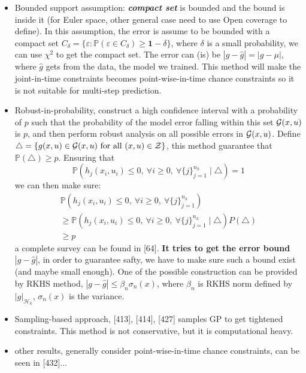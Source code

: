 \documentclass[10pt]{elegantbook}
\newcommand{\mydefination}[1]{\textbf{\textit{\textcolor{structurecolor}{#1}}}}
\begin{document}
\begin{itemize}
    \item Bounded support assumption: \mydefination{compact set} is bounded and the bound is inside it (for Euler space, other 
    general case need to use Open coverage to define). In this assumption, the error is assume to be bounded with a compact set
    $C_{\delta}=\{\varepsilon:\mathbb{P}(\varepsilon\in C_{\delta})\geq{\mathbf{1}}-\delta\}$, where $\delta$ is a small 
    probability, we can use $\chi^2$ to get the compact set. The error can (is) be $|g - \hat g| = |g - \mu|$, where $\hat g$ gets from the data, the model we trained. 
    This method will make the joint-in-time constraints becomes point-wise-in-time chance constraints so 
    it is not suitable for multi-step prediction.

    \item Robust-in-probability, construct a high confidence interval with a probability of $p$ such that the probability of the model error
    falling within this set ${\cal G}(x,u)$ is $p$, and then perform robust analysis on all possible errors in ${\cal G}(x,u)$.
    Define $\triangle=\left\{g(x,u)\in{\cal G}(x,u) \mathrm{~ for ~ all ~} (x,u)\in\mathcal{Z}\right\}$,
    this method guarantee that $\mathbb P(\triangle) \geq p$. Ensuring that 
    \[ \mathbb{P}(h_{j}(x_{i},u_{i})\leq0, ~ \forall i\geq0, ~ \forall\{j\}_{j=1}^{n_{h}}\mid\triangle)=1 \]
    we can then make sure:
    \[
    \begin{array}{l}
        \mathbb{P}(h_{j}(x_{i},u_{i})\leq0, ~ \forall i\geq0, ~ \forall\{j\}_{j=1}^{n_{h}}) \\
        \geq \mathbb{P}(h_{j}(x_{i},u_{i})\leq0, ~ \forall i\geq0, ~ \forall\{j\}_{j=1}^{n_{h}}\mid\triangle) P(\triangle) \\
        \geq p
    \end{array}
    \]
    a complete survey can be found in [64].
    \textbf{It tries to get the error bound} $|g - \hat g|$, in order to guarantee safty, we have to make sure such a bound exist (and maybe small enough). 
    One of the possible construction can be provided by RKHS method,
$|g - \hat g| \leq \beta_n \sigma_n(x)$, where $\beta_n$ is RKHS norm defined by $|g|_{\mathcal H_k}$, $\sigma_n(x)$ is the variance.
    \item Sampling-based approach, [413], [414], [427] samples GP to get tightened constraints. This method is not conservative,
but it is computational heavy.
    \item other results, generally consider point-wise-in-time chance constraints, can be seen in [432]...
\end{itemize}
\end{document}
